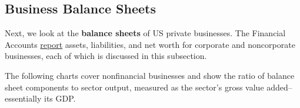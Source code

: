 \subsection*{Business Balance Sheets}
\begin{minipage}{0.76\textwidth}      

\small Next, we look at the \textbf{balance sheets} of US private businesses. The Financial Accounts \href{https://www.federalreserve.gov/releases/z1/}{report} assets, liabilities, and net worth for corporate and noncorporate businesses, each of which is discussed in this subsection. 

The following charts cover nonfinancial businesses and show the ratio of balance sheet components to sector output, measured as the sector's gross value added--essentially its GDP. 
\vspace{0.5mm}

\vspace{-1.5mm}

\busbsgva


\end{minipage}
